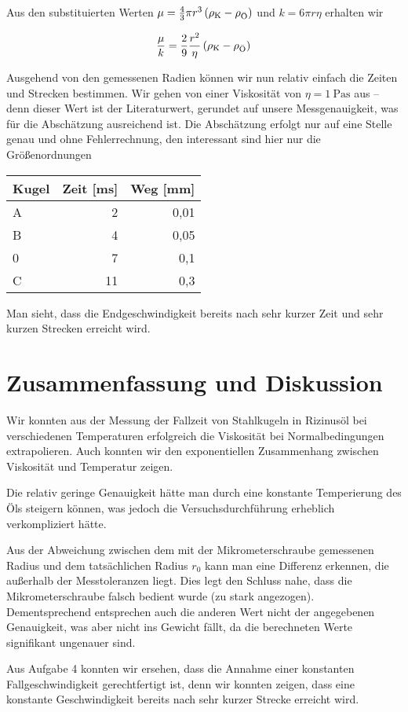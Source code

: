 \documentclass[a4paper,german,12pt,smallheadings]{scrartcl}
\begin{document}
Aus den substituierten Werten $\mu = \frac{4}{3} \pi r^3 \del{\rho_\text{K} -
\rho_\text{Ö}}$ und $k = 6 \pi r \eta$ erhalten wir

\begin{equation}
  \frac{\mu}{k} = \frac{2}{9} \frac{r^2}{\eta} \del{ \rho_\text{K} - \rho_\text{Ö} }
\end{equation}

Ausgehend von den gemessenen Radien können wir nun relativ einfach die Zeiten
und Strecken bestimmen. Wir gehen von einer Viskosität von $\eta =
\SI{1}{\pascal \second}$ aus -- denn dieser Wert ist der Literaturwert,
gerundet auf unsere Messgenauigkeit, was für die Abschätzung ausreichend ist.
Die Abschätzung erfolgt nur auf eine Stelle genau und ohne Fehlerrechnung, den
interessant sind hier nur die Größenordnungen

\vspace{0.5 cm}
\begin{tabular}{l|r|r}
  Kugel & Zeit [ms] & Weg [mm] \\
  \hline
  A & 2 & 0{,}01 \\
  B & 4 & 0{,}05 \\
  0 & 7 & 0{,}1 \\
  C & 11 & 0{,}3
\end{tabular}
\vspace{0.5 cm}

Man sieht, dass die Endgeschwindigkeit bereits nach sehr kurzer Zeit und sehr
kurzen Strecken erreicht wird.

\section*{Zusammenfassung und Diskussion}

Wir konnten aus der Messung der Fallzeit von Stahlkugeln in Rizinusöl bei
verschiedenen Temperaturen erfolgreich die Viskosität bei Normalbedingungen
extrapolieren. Auch konnten wir den exponentiellen Zusammenhang zwischen
Viskosität und Temperatur zeigen.

Die relativ geringe Genauigkeit hätte man durch eine konstante Temperierung des
Öls steigern können, was jedoch die Versuchsdurchführung erheblich
verkompliziert hätte.

Aus der Abweichung zwischen dem mit der Mikrometerschraube gemessenen Radius
und dem tatsächlichen Radius $r_0$ kann man eine Differenz erkennen, die
außerhalb der Messtoleranzen liegt. Dies legt den Schluss nahe, dass die
Mikrometerschraube falsch bedient wurde (zu stark angezogen).
Dementsprechend entsprechen auch die anderen Wert nicht der angegebenen
Genauigkeit, was aber nicht ins Gewicht fällt, da die berechneten Werte
signifikant ungenauer sind.

Aus Aufgabe 4 konnten wir ersehen, dass die Annahme einer konstanten
Fallgeschwindigkeit gerechtfertigt ist, denn wir konnten zeigen, dass eine
konstante Geschwindigkeit bereits nach sehr kurzer Strecke erreicht wird.

\begin{landscape}
  
\end{landscape}
\end{document}
